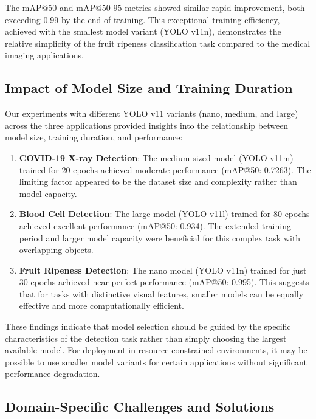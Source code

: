 \begin{multicols}{2}
The mAP@50 and mAP@50-95 metrics showed similar rapid improvement, both exceeding 0.99 by the end of training. This exceptional training efficiency, achieved with the smallest model variant (YOLO v11n), demonstrates the relative simplicity of the fruit ripeness classification task compared to the medical imaging applications.

\subsection{Impact of Model Size and Training Duration}
Our experiments with different YOLO v11 variants (nano, medium, and large) across the three applications provided insights into the relationship between model size, training duration, and performance:

\begin{enumerate}
    \item \textbf{COVID-19 X-ray Detection}: The medium-sized model (YOLO v11m) trained for 20 epochs achieved moderate performance (mAP@50: 0.7263). The limiting factor appeared to be the dataset size and complexity rather than model capacity.
    
    \item \textbf{Blood Cell Detection}: The large model (YOLO v11l) trained for 80 epochs achieved excellent performance (mAP@50: 0.934). The extended training period and larger model capacity were beneficial for this complex task with overlapping objects.
    
    \item \textbf{Fruit Ripeness Detection}: The nano model (YOLO v11n) trained for just 30 epochs achieved near-perfect performance (mAP@50: 0.995). This suggests that for tasks with distinctive visual features, smaller models can be equally effective and more computationally efficient.
\end{enumerate}

These findings indicate that model selection should be guided by the specific characteristics of the detection task rather than simply choosing the largest available model. For deployment in resource-constrained environments, it may be possible to use smaller model variants for certain applications without significant performance degradation.

\subsection{Domain-Specific Challenges and Solutions}


\end{multicols}
